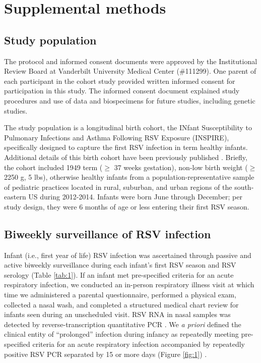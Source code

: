 \documentclass{article} %
\newcommand{\beginsupplement}{%
        \setcounter{table}{0}
        \renewcommand{\thetable}{S\arabic{table}}%
        \setcounter{figure}{0}
        \renewcommand{\thefigure}{S\arabic{figure}}%
     }
\begin{document}




\beginsupplement
\section{Supplemental methods}
 \label{sec:Supplemental_text}

\subsection{Study population}  \label{sec:Supplemental_start}
The protocol and informed consent documents were approved by the Institutional Review Board at Vanderbilt University Medical Center (\#111299). 
One parent of each participant in the cohort study provided written informed consent for participation in this study. 
The informed consent document explained study procedures and use of data and biospecimens for future studies, including genetic studies.

The study population is a longitudinal birth cohort, the INfant Susceptibility to Pulmonary Infections and Asthma Following RSV Exposure (INSPIRE), specifically designed to capture the first RSV infection in term healthy infants. Additional details of this birth cohort have been previously published
\citep{larkin_objectives_2015}. 
Briefly, the cohort included 1949 term ($\ge$ 37 weeks gestation), non-low birth weight ($\ge$ 2250 g, 5 lbs), otherwise healthy infants from a population-representative sample of pediatric practices located in rural, suburban, and urban regions of the south-eastern US during 2012-2014. 
Infants were born June through December; per study design, they were 6 months of age or less entering their first RSV season.

\subsection{Biweekly surveillance of RSV infection}
Infant (i.e., first year of life) RSV infection was ascertained through passive and active biweekly surveillance during each infant's first RSV season and RSV serology (Table \ref{tab:1}). 
If an infant met pre-specified criteria for an acute respiratory infection, we conducted an in-person respiratory illness visit at which time we administered a parental questionnaire, performed a physical exam, collected a nasal wash, and completed a structured medical chart review for infants seen during an unscheduled visit. RSV RNA in nasal samples was detected by reverse-transcription quantitative PCR
\citep{larkin2015objectives}. 
We \textit{a priori} defined the clinical entity of ``prolonged'' infection during infancy as repeatedly meeting pre-specified criteria for an acute respiratory infection accompanied by repeatedly positive RSV PCR separated by 15 or more days (Figure \ref{fig:1}) 
\citep{okiro2010duration}.
\end{document}
